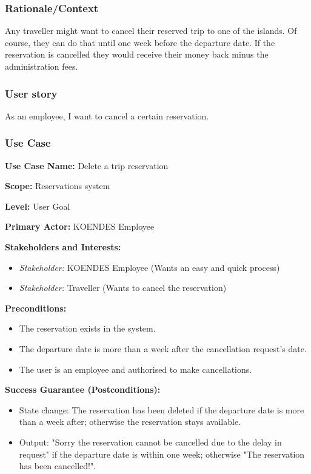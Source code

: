 \subsubsection{Rationale/Context}

Any traveller might want to cancel their reserved trip to one of the islands. Of course, they can do that until one week before the departure date. If the reservation is cancelled they would receive their money back minus the administration fees.

\subsubsection{User story}

As an employee, I want to cancel a certain reservation.

\subsubsection{Use Case}
\creator{\studentC}

\textbf{Use Case Name:} Delete a trip reservation

\textbf{Scope:} Reservations system

\textbf{Level:} User Goal

\textbf{Primary Actor:} KOENDES Employee

\textbf{Stakeholders and Interests:} 
\begin{itemize}
\item \textit{Stakeholder:} KOENDES Employee (Wants an easy and quick process)
\item \textit{Stakeholder:} Traveller (Wants to cancel the reservation)
\end{itemize}

\textbf{Preconditions:} 
\begin{itemize}
\item The reservation exists in the system.
\item The departure date is more than a week after the cancellation request's date.
\item The user is an employee and authorised to make cancellations.
\end{itemize}

\textbf{Success Guarantee (Postconditions):}
\begin{itemize}
\item State change: The reservation has been deleted if the departure date is more than a week after; otherwise the reservation stays available.
\item Output: "Sorry the reservation cannot be cancelled due to the delay in request" if the departure date is within one week; otherwise "The reservation has been cancelled!".
\end{itemize}

